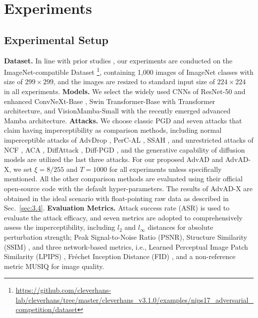 \documentclass{article}
\begin{document}
\section{Experiments}
\setcounter{footnote}{0}
\subsection{Experimental Setup}
\textbf{Dataset.} In line with prior studies \cite{zhao2020towards,yuan2022natural,wei2023enhancing,chen2024content}, our experiments are conducted on the ImageNet-compatible Dataset \footnote{\scriptsize\url{https://github.com/cleverhans-lab/cleverhans/tree/master/cleverhans_v3.1.0/examples/nips17_adversarial_competition/dataset}},
containing 1,000 images of ImageNet \cite{russakovsky2015imagenet} classes with size of $299\times299$, and the images are resized to standard input size of $224\times224$ in all experiments. 
\textbf{Models.} We select
the widely used CNNs of ResNet-50 \cite{he2016deep} and enhanced ConvNeXt-Base \cite{liu2022convnet}, Swin Transformer-Base \cite{liu2021swin} with Transformer \cite{vaswani2017attention} architecture, and VisionMamba-Small \cite{zhu2024vision} with the recently emerged advanced Mamba \cite{gu2023mamba} architecture. 
\textbf{Attacks.} We choose classic PGD \cite{madry2018towards} and seven attacks that claim having imperceptibility as comparison methods, including normal imperceptible attacks of AdvDrop \cite{duan2021advdrop}, PerC-AL \cite{zhao2020towards}, SSAH \cite{luo2022frequency}, and unrestricted attacks of NCF \cite{yuan2022natural}, ACA \cite{chen2024content},  DiffAttack \cite{chen2023diffusion}, Diff-PGD \cite{xue2023diffusion}, and the generative capability of diffusion models are utilized the last three attacks.  For our proposed AdvAD and AdvAD-X, we set $\xi=8/255$ and $T=1000$ for all experiments unless specifically mentioned. All the other comparison methods are evaluated using their official open-source code with the default hyper-parameters.
The results of AdvAD-X are obtained in the ideal scenario with float-pointing raw data as described in Sec.~\ref{sec:3.4}.
\textbf{Evaluation Metrics.} Attack success rate (ASR) is used to evaluate the attack efficacy, and seven metrics are adopted to comprehensively assess the imperceptibility, including $l_2$ and $l_\infty$ distances for absolute perturbation strength; Peak Signal-to-Noise Ratio (PSNR), Structure Similarity (SSIM) \cite{wang2004image}, and three network-based metrics, i.e., Learned Perceptual Image Patch Similarity (LPIPS) \cite{zhang2018unreasonable}, Fréchet Inception Distance (FID) \cite{heusel2017gans}, and a non-reference metric MUSIQ \cite{ke2021musiq} for image quality. 
\end{document}
